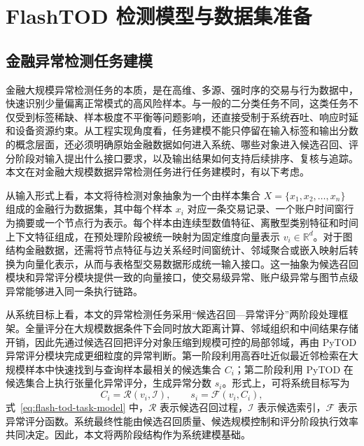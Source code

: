 
\chapter{FlashTOD 检测模型与数据集准备}

\section{金融异常检测任务建模}

金融大规模异常检测任务的本质，是在高维、多源、强时序的交易与行为数据中，快速识别少量偏离正常模式的高风险样本。与一般的二分类任务不同，这类任务不仅受到标签稀缺、样本极度不平衡等问题影响，还直接受制于系统吞吐、响应时延和设备资源约束。从工程实现角度看，任务建模不能只停留在输入标签和输出分数的概念层面，还必须明确原始金融数据如何进入系统、哪些对象进入候选召回、评分阶段对输入提出什么接口要求，以及输出结果如何支持后续排序、复核与追踪。本文在对金融大规模数据异常检测任务进行任务建模时，有以下考虑。

从输入形式上看，本文将待检测对象抽象为一个由样本集合 $X=\{x_1,x_2,\ldots,x_n\}$ 组成的金融行为数据集，其中每个样本 $x_i$ 对应一条交易记录、一个账户时间窗行为摘要或一个节点行为表示。每个样本由连续型数值特征、离散型类别特征和时间上下文特征组成，在预处理阶段被统一映射为固定维度向量表示 $v_i\in\mathbb{R}^d$。对于图结构金融数据，还需将节点特征与边关系经时间窗统计、邻域聚合或嵌入映射后转换为向量化表示，从而与表格型交易数据形成统一输入接口\citep{dgraphfin_paper}。这一抽象为候选召回模块和异常评分模块提供一致的向量接口，使交易级异常、账户级异常与图节点级异常能够进入同一条执行链路。

从系统目标上看，本文的异常检测任务采用``候选召回---异常评分''两阶段处理框架。全量评分在大规模数据条件下会同时放大距离计算、邻域组织和中间结果存储开销，因此先通过候选召回把评分对象压缩到规模可控的局部邻域，再由 PyTOD 异常评分模块完成更细粒度的异常判断。第一阶段利用高吞吐近似最近邻检索在大规模样本中快速找到与查询样本最相关的候选集合 $C_i$；第二阶段利用 PyTOD 在候选集合上执行张量化异常评分，生成异常分数 $s_i$。形式上，可将系统目标写为
\begin{equation}
  C_i = \mathcal{R}(v_i, \mathcal{I}), \qquad s_i = \mathcal{F}(v_i, C_i),
  \label{eq:flash-tod-task-model}
\end{equation}
式~\eqref{eq:flash-tod-task-model} 中，$\mathcal{R}$ 表示候选召回过程，$\mathcal{I}$ 表示候选索引，$\mathcal{F}$ 表示异常评分函数。系统最终性能由候选召回质量、候选规模控制和评分阶段执行效率共同决定。因此，本文将两阶段结构作为系统建模基础\citep{zhao2022tod}。

